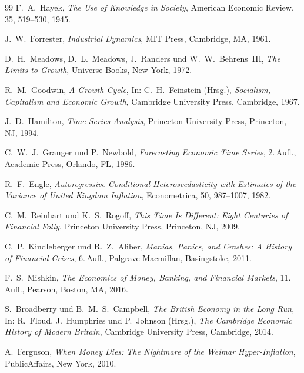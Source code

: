 \documentclass[a4paper, 12pt, twoside, openright]{report}
\theoremstyle{definition}
\theoremstyle{definition}
\begin{document}
\begin{thebibliography}{99}
	F.~A.~Hayek,
	\textit{The Use of Knowledge in Society},
	American Economic Review, 35, 519--530, 1945.

	J.~W.~Forrester,
	\textit{Industrial Dynamics},
	MIT Press, Cambridge, MA, 1961.

	D.~H.~Meadows, D.~L.~Meadows, J.~Randers und W.~W.~Behrens~III,
	\textit{The Limits to Growth},
	Universe Books, New York, 1972.

	R.~M.~Goodwin,
	\textit{A Growth Cycle},
	In: C.~H.~Feinstein (Hrsg.), \textit{Socialism, Capitalism and Economic Growth},
	Cambridge University Press, Cambridge, 1967.

	J.~D.~Hamilton,
	\textit{Time Series Analysis},
	Princeton University Press, Princeton, NJ, 1994.

	C.~W.~J.~Granger und P.~Newbold,
	\textit{Forecasting Economic Time Series},
	2.\,Aufl., Academic Press, Orlando, FL, 1986.

	R.~F.~Engle,
	\textit{Autoregressive Conditional Heteroscedasticity with Estimates of the Variance of United Kingdom Inflation},
	Econometrica, 50, 987--1007, 1982.

	C.~M.~Reinhart und K.~S.~Rogoff,
	\textit{This Time Is Different: Eight Centuries of Financial Folly},
	Princeton University Press, Princeton, NJ, 2009.

	C.~P.~Kindleberger und R.~Z.~Aliber,
	\textit{Manias, Panics, and Crashes: A History of Financial Crises},
	6.\,Aufl., Palgrave Macmillan, Basingstoke, 2011.

	F.~S.~Mishkin,
	\textit{The Economics of Money, Banking, and Financial Markets},
	11.\,Aufl., Pearson, Boston, MA, 2016.

	S.~Broadberry und B.~M.~S.~Campbell,
	\textit{The British Economy in the Long Run},
	In: R.~Floud, J.~Humphries und P.~Johnson (Hrsg.), \textit{The Cambridge Economic History of Modern Britain},
	Cambridge University Press, Cambridge, 2014.

	A.~Ferguson,
	\textit{When Money Dies: The Nightmare of the Weimar Hyper-Inflation},
	PublicAffairs, New York, 2010.


\end{thebibliography}
\end{document}
